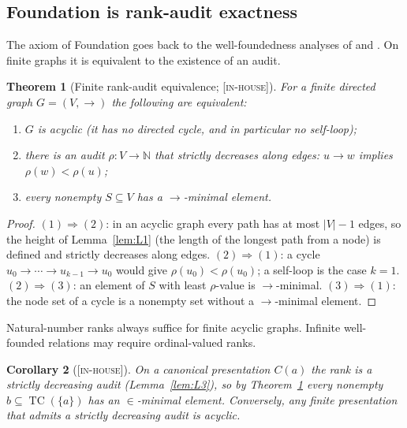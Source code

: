 \documentclass[11pt]{article}
\newcommand{\TC}{\operatorname{TC}}
\newcommand{\gradetag}[1]{\textnormal{\textsc{[#1]}}}
\newcommand{\inhouse}{\gradetag{in-house}}
\newtheorem{theorem}{Theorem}[section]
\newtheorem{corollary}[theorem]{Corollary}
\theoremstyle{definition}
\begin{document}
\subsection{Foundation is rank-audit exactness}\label{ssec:foundation}

The axiom of Foundation goes back to the well-foundedness analyses of \citet{Mirimanoff1917} and
\citet{VonNeumann1928}. On finite graphs it is equivalent to the existence of an audit.

\begin{theorem}[Finite rank-audit equivalence; \inhouse]\label{thm:tfae}
For a finite directed graph $G=(V,\to)$ the following are equivalent:
\begin{enumerate}\itemsep0pt
  \item $G$ is acyclic (it has no directed cycle, and in particular no self-loop);
  \item there is an audit $\rho\colon V\to\mathbb N$ that strictly decreases along edges:
  $u\to w$ implies $\rho(w)<\rho(u)$;
  \item every nonempty $S\subseteq V$ has a $\to$-minimal element.
\end{enumerate}
\end{theorem}

\begin{proof}
$(1)\Rightarrow(2)$: in an acyclic graph every path has at most $|V|-1$ edges, so the height
of Lemma~\ref{lem:L1} (the length of the longest path from a node) is defined and strictly
decreases along edges. $(2)\Rightarrow(1)$: a cycle $u_0\to\cdots\to u_{k-1}\to u_0$ would give
$\rho(u_0)<\rho(u_0)$; a self-loop is the case $k=1$. $(2)\Rightarrow(3)$: an element of $S$
with least $\rho$-value is $\to$-minimal. $(3)\Rightarrow(1)$: the node set of a cycle is a
nonempty set without a $\to$-minimal element.
\end{proof}

\noindent Natural-number ranks always suffice for finite acyclic graphs. Infinite well-founded
relations may require ordinal-valued ranks.

\begin{corollary}[\inhouse]\label{cor:foundation}
On a canonical presentation $C(a)$ the rank is a strictly decreasing audit (Lemma~\ref{lem:L3}),
so by Theorem~\ref{thm:tfae} every nonempty $b\subseteq\TC(\{a\})$ has an $\in$-minimal element.
Conversely, any finite presentation that admits a strictly decreasing audit is acyclic.
\end{corollary}
\end{document}
